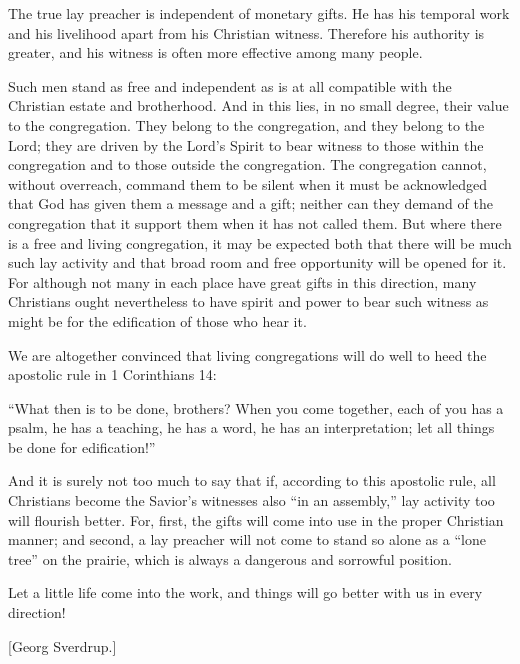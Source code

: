 The true lay preacher is independent of monetary gifts. He has his temporal work and his livelihood apart from his Christian witness. Therefore his authority is greater, and his witness is often more effective among many people.

Such men stand as free and independent as is at all compatible with the Christian estate and brotherhood. And in this lies, in no small degree, their value to the congregation. They belong to the congregation, and they belong to the Lord; they are driven by the Lord’s Spirit to bear witness to those within the congregation and to those outside the congregation. The congregation cannot, without overreach, command them to be silent when it must be acknowledged that God has given them a message and a gift; neither can they demand of the congregation that it support them when it has not called them. But where there is a free and living congregation, it may be expected both that there will be much such lay activity and that broad room and free opportunity will be opened for it. For although not many in each place have great gifts in this direction, many Christians ought nevertheless to have spirit and power to bear such witness as might be for the edification of those who hear it.

We are altogether convinced that living congregations will do well to heed the apostolic rule in 1 Corinthians 14:

“What then is to be done, brothers? When you come together, each of you has a psalm, he has a teaching, he has a word, he has an interpretation; let all things be done for edification!”

And it is surely not too much to say that if, according to this apostolic rule, all Christians become the Savior’s witnesses also “in an assembly,” lay activity too will flourish better. For, first, the gifts will come into use in the proper Christian manner; and second, a lay preacher will not come to stand so alone as a “lone tree” on the prairie, which is always a dangerous and sorrowful position.

Let a little life come into the work, and things will go better with us in every direction!

[Georg Sverdrup.]


